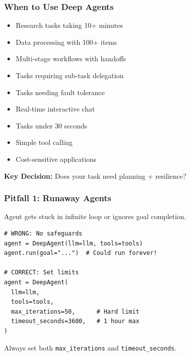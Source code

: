 \documentclass[aspectratio=169,11pt]{beamer}
\begin{document}
\begin{frame}[fragile]
\frametitle{When to Use Deep Agents}

\begin{tipbox}
\begin{itemize}
    \setlength{\itemsep}{1pt}
  \item Research tasks taking 10+ minutes
  \item Data processing with 100+ items
  \item Multi-stage workflows with handoffs
  \item Tasks requiring sub-task delegation
  \item Tasks needing fault tolerance
\end{itemize}
\end{tipbox}

\begin{warningbox}
\begin{itemize}
    \setlength{\itemsep}{1pt}
  \item Real-time interactive chat
  \item Tasks under 30 seconds
  \item Simple tool calling
  \item Cost-sensitive applications
\end{itemize}
\end{warningbox}

\vspace{1em}
\begin{center}
\textcolor{lcblue}{\textbf{Key Decision:}} Does your task need planning + resilience?
\end{center}

\end{frame}

\begin{frame}[fragile]
\frametitle{Pitfall 1: Runaway Agents}

\begin{warningbox}
Agent gets stuck in infinite loop or ignores goal completion.
\end{warningbox}

\begin{lstlisting}
# WRONG: No safeguards
agent = DeepAgent(llm=llm, tools=tools)
agent.run(goal="...")  # Could run forever!

# CORRECT: Set limits
agent = DeepAgent(
  llm=llm,
  tools=tools,
  max_iterations=50,      # Hard limit
  timeout_seconds=3600,   # 1 hour max
)
\end{lstlisting}

\begin{tipbox}
Always set both \texttt{max\_iterations} and \texttt{timeout\_seconds}.
\end{tipbox}

\end{frame}
\end{document}
